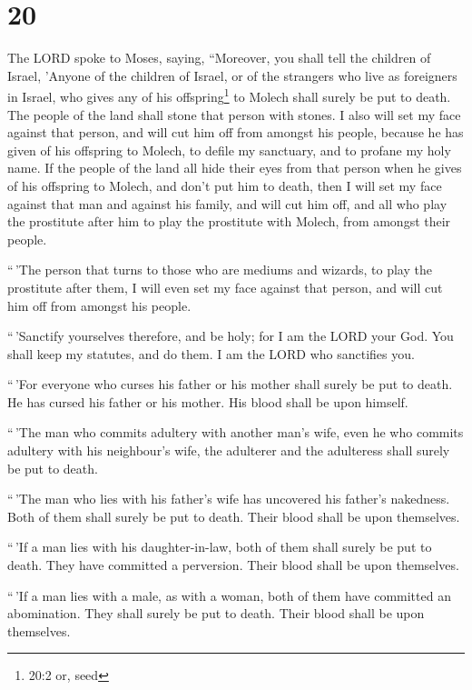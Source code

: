 \hypertarget{section-19}{%
\section{20}\label{section-19}}

 The LORD spoke to Moses, saying,  ``Moreover,
you shall tell the children of Israel, 'Anyone of the children of
Israel, or of the strangers who live as foreigners in Israel, who gives
any of his offspring\footnote{20:2 or, seed} to Molech shall surely be
put to death. The people of the land shall stone that person with
stones.  I also will set my face against that person, and
will cut him off from amongst his people, because he has given of his
offspring to Molech, to defile my sanctuary, and to profane my holy
name.  If the people of the land all hide their eyes from
that person when he gives of his offspring to Molech, and don't put him
to death,  then I will set my face against that man and
against his family, and will cut him off, and all who play the
prostitute after him to play the prostitute with Molech, from amongst
their people.

 ``\,'The person that turns to those who are mediums and
wizards, to play the prostitute after them, I will even set my face
against that person, and will cut him off from amongst his people.

 ``\,'Sanctify yourselves therefore, and be holy; for I am
the LORD your God.  You shall keep my statutes, and do them.
I am the LORD who sanctifies you.

 ``\,'For everyone who curses his father or his mother shall
surely be put to death. He has cursed his father or his mother. His
blood shall be upon himself.

 ``\,'The man who commits adultery with another man's wife,
even he who commits adultery with his neighbour's wife, the adulterer
and the adulteress shall surely be put to death.

 ``\,'The man who lies with his father's wife has uncovered
his father's nakedness. Both of them shall surely be put to death. Their
blood shall be upon themselves.

 ``\,'If a man lies with his daughter-in-law, both of them
shall surely be put to death. They have committed a perversion. Their
blood shall be upon themselves.

 ``\,'If a man lies with a male, as with a woman, both of
them have committed an abomination. They shall surely be put to death.
Their blood shall be upon themselves.

